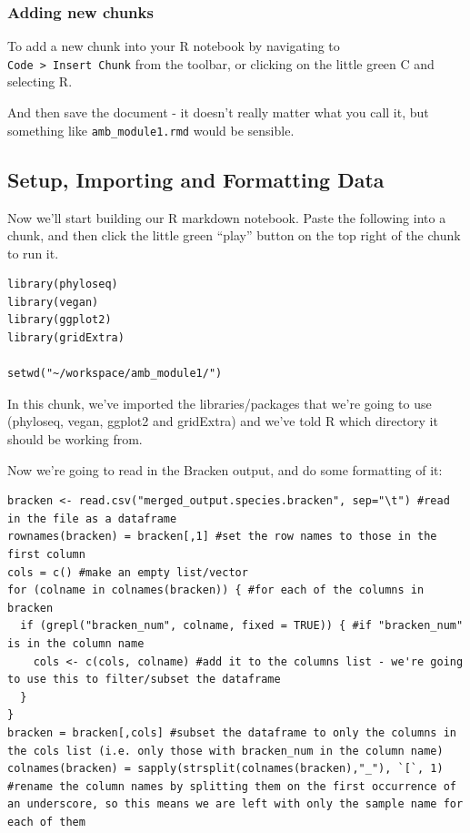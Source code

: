 \documentclass[
]{book}
\begin{document}
\subsubsection{Adding new chunks}\label{adding-new-chunks}

To add a new chunk into your R notebook by navigating to \texttt{Code\ \textgreater{}\ Insert\ Chunk} from the toolbar, or clicking on the little green C and selecting R.

And then save the document - it doesn't really matter what you call it, but something like \texttt{amb\_module1.rmd} would be sensible.

\subsection{Setup, Importing and Formatting Data}\label{setup-importing-and-formatting-data}

Now we'll start building our R markdown notebook. Paste the following into a chunk, and then click the little green ``play'' button on the top right of the chunk to run it.

\begin{verbatim}
library(phyloseq)
library(vegan)
library(ggplot2)
library(gridExtra)

setwd("~/workspace/amb_module1/")
\end{verbatim}

In this chunk, we've imported the libraries/packages that we're going to use (phyloseq, vegan, ggplot2 and gridExtra) and we've told R which directory it should be working from.

Now we're going to read in the Bracken output, and do some formatting of it:

\begin{verbatim}
bracken <- read.csv("merged_output.species.bracken", sep="\t") #read in the file as a dataframe
rownames(bracken) = bracken[,1] #set the row names to those in the first column
cols = c() #make an empty list/vector
for (colname in colnames(bracken)) { #for each of the columns in bracken
  if (grepl("bracken_num", colname, fixed = TRUE)) { #if "bracken_num" is in the column name
    cols <- c(cols, colname) #add it to the columns list - we're going to use this to filter/subset the dataframe
  }
}
bracken = bracken[,cols] #subset the dataframe to only the columns in the cols list (i.e. only those with bracken_num in the column name)
colnames(bracken) = sapply(strsplit(colnames(bracken),"_"), `[`, 1) #rename the column names by splitting them on the first occurrence of an underscore, so this means we are left with only the sample name for each of them
\end{verbatim}
\end{document}
